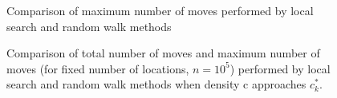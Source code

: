 \begin{figure}[h!]  
   \centering  
   \quad
   \vspace{-8pt}
   \caption{Comparison of maximum number of moves performed by local search and random walk methods}
    \label{fig:2}
\end{figure}
\begin{figure}[h!]
   \centering  
   \quad
       \vspace{-8pt}
   \caption{ Comparison of total number of moves and maximum number of moves (for fixed number of locations, $n=10^5$) performed by local search and random walk methods when density c approaches $c^*_k$.}
      \vspace{-1pt}
   \label{fig:3}
\end{figure}
